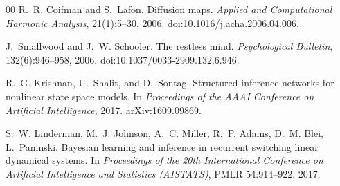 \documentclass[5p,twocolumn,authoryear]{elsarticle}
\begin{document}
\begin{thebibliography}{00}
R.~R. Coifman and S.~Lafon.
\newblock Diffusion maps.
\newblock \emph{Applied and Computational Harmonic Analysis}, 21(1):5--30, 2006.
\newblock doi:10.1016/j.acha.2006.04.006.

J.~Smallwood and J.~W. Schooler.
\newblock The restless mind.
\newblock \emph{Psychological Bulletin}, 132(6):946--958, 2006.
\newblock doi:10.1037/0033-2909.132.6.946.

R.~G. Krishnan, U.~Shalit, and D.~Sontag.
\newblock Structured inference networks for nonlinear state space models.
\newblock In \emph{Proceedings of the AAAI Conference on Artificial Intelligence}, 2017.
\newblock arXiv:1609.09869.

S.~W. Linderman, M.~J. Johnson, A.~C. Miller, R.~P. Adams, D.~M. Blei, L.~Paninski.
\newblock Bayesian learning and inference in recurrent switching linear dynamical systems.
\newblock In \emph{Proceedings of the 20th International Conference on Artificial Intelligence and Statistics (AISTATS)}, PMLR 54:914--922, 2017.


\end{thebibliography}
\end{document}
